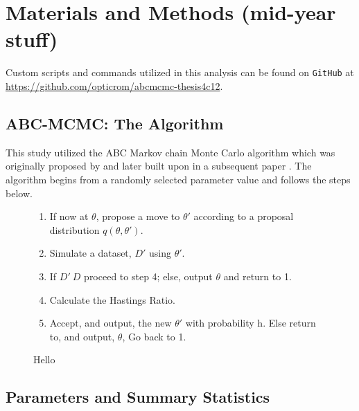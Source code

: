 \documentclass{article}
\begin{document}

\section{Materials and Methods (mid-year stuff)} 
\label{methods}
Custom scripts and commands utilized in this analysis can be found on \texttt{GitHub} at
\url{https://github.com/opticrom/abcmcmc-thesis4c12}.


\subsection{ABC-MCMC: The Algorithm}

This study utilized the ABC Markov chain Monte Carlo algorithm which was originally proposed by \citet{marjoram2003markov} and later built upon in a subsequent paper \citep{marjoram2013approximation}. The algorithm begins from a randomly selected parameter value and follows the steps below.

\begin{figure}[h]
	\begin{enumerate}
		\item If now at $\theta$, propose a move to $\theta'$ according to a proposal distribution $q(\theta, \theta')$.
		\item Simulate a dataset, $D'$ using $\theta'$.
		\item If $D' ~ D$ proceed to step 4; else, output $\theta$ and return to 1.
		\item Calculate the Hastings Ratio.
		\item Accept, and output, the new $\theta'$ with probability h. Else return to, and output, $\theta$, Go back to 1.
	\end{enumerate}
	\label{fig:algorithm1}
	\caption{Hello}
\end{figure}

\subsection{Parameters and Summary Statistics}
\end{document}
